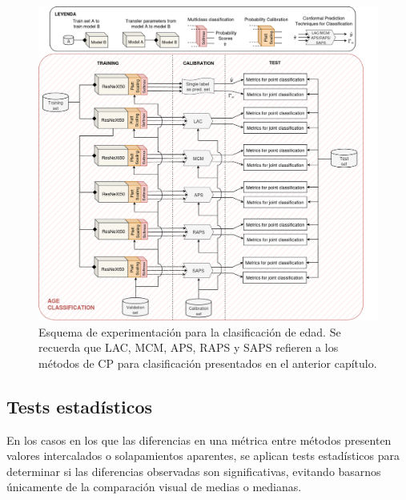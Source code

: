 \begin{figure}[h]
    \centering
    \includegraphics[angle=90, width=\textwidth]{capitulos/cap_05/imagenes/AGC_experimental_pipeline.png}
    \caption[
        Esquema de experimentación para la clasificación de edad. 
    ]{
        Esquema de experimentación para la clasificación de edad. Se recuerda que LAC, MCM, APS, RAPS y SAPS refieren a los métodos de CP para clasificación presentados en el anterior capítulo. 
    } 
    \label{fig:AGC_experimental_pipeline}
\end{figure}

\FloatBarrier



\subsection{Tests estadísticos}

En los casos en los que las diferencias en una métrica entre métodos presenten valores intercalados o solapamientos aparentes, se aplican tests estadísticos para determinar si las diferencias observadas son significativas, evitando basarnos únicamente de la comparación visual de medias o medianas.

